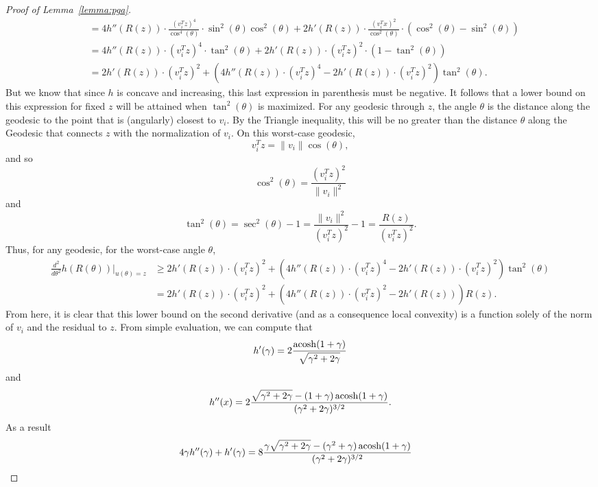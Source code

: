 \begin{proof}[Proof of Lemma~\ref{lemma:pga}]
\begin{align*}
  &=
  4 h''(R(z)) \cdot \frac{ (v_i^T z)^4 }{\cos^4(\theta)} \cdot \sin^2(\theta) \cos^2(\theta)
  +
  2 h'(R(z)) \cdot \frac{ (v_i^T x)^2 }{\cos^2(\theta)} \cdot \left( \cos^2(\theta) - \sin^2(\theta) \right) \\
  &=
  4 h''(R(z)) \cdot (v_i^T z)^4 \cdot \tan^2(\theta)
  +
  2 h'(R(z)) \cdot (v_i^T z)^2 \cdot \left( 1 - \tan^2(\theta) \right) \\
  &=
  2 h'(R(z)) \cdot (v_i^T z)^2 
  +
  \left(
    4 h''(R(z)) \cdot (v_i^T z)^4
    -
    2 h'(R(z)) \cdot (v_i^T z)^2
  \right)
  \tan^2(\theta).
\end{align*}
But we know that since $h$ is concave and increasing, this last expression in parenthesis must be negative.
It follows that a lower bound on this expression for fixed $z$ will be attained when $\tan^2(\theta)$ is maximized.
For any geodesic through $z$, the angle $\theta$ is the distance along the geodesic to the point that is (angularly) closest to $v_i$.
By the Triangle inequality, this will be no greater than the distance $\theta$ along the Geodesic that connects $z$ with the normalization of $v_i$.
On this worst-case geodesic,
\[
  v_i^T z = \|v_i\| \cos(\theta),
\]
and so
\[
  \cos^2(\theta) = \frac{(v_i^T z)^2}{\|v_i\|^2}
\]
and
\[
  \tan^2(\theta) = \sec^2(\theta) - 1 = \frac{\|v_i\|^2}{(v_i^T z)^2} - 1 = \frac{R(z)}{(v_i^T z)^2}.
\]
Thus, for any geodesic, for the worst-case angle $\theta$,
\begin{align*}
  \frac{d^2}{d \theta^2} h(R(\theta)) \big|_{u(\theta) = z}
  &\ge
  2 h'(R(z)) \cdot (v_i^T z)^2 
  +
  \left(
    4 h''(R(z)) \cdot (v_i^T z)^4
    -
    2 h'(R(z)) \cdot (v_i^T z)^2
  \right)
  \tan^2(\theta) \\
  &=
  2 h'(R(z)) \cdot (v_i^T z)^2 
  +
  \left(
    4 h''(R(z)) \cdot (v_i^T z)^2
    -
    2 h'(R(z))
  \right)
  R(z).
\end{align*}
From here, it is clear that this lower bound on the second derivative (and as a consequence local convexity) is a function solely of the norm of $v_i$ and the residual to $z$.
From simple evaluation, we can compute that
\[
  h'(\gamma) = 2 \frac{\operatorname{acosh}(1+\gamma)}{\sqrt{\gamma^2 + 2\gamma}}
\]
and
\[
  h''(x)
  =
  2 \frac{
    \sqrt{\gamma^2 + 2\gamma}
    -
    (1 + \gamma) \operatorname{acosh}(1 + \gamma)
  }{
    (\gamma^2 + 2\gamma)^{3/2}
  }.
\]
As a result
\begin{align*}
  4 \gamma h''(\gamma) + h'(\gamma)
  &=
  8 \frac{
    \gamma \sqrt{\gamma^2 + 2\gamma}
    -
    (\gamma^2 + \gamma) \operatorname{acosh}(1 + \gamma)
  }{
    (\gamma^2 + 2\gamma)^{3/2}
}
\end{align*}
\end{proof}
